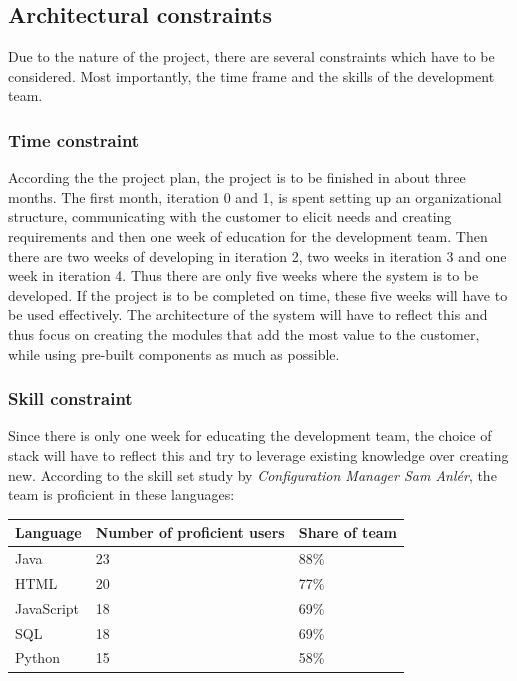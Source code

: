 \documentclass{article}
\begin{document}
\subsection{Architectural constraints}
Due to the nature of the project, there are several constraints which have to be considered. Most importantly, the time frame and the skills of the development team.

\subsubsection{Time constraint}
According the the project plan, the project is to be finished in about three months. The first month, iteration 0 and 1, is spent setting up an organizational structure, communicating with the customer to elicit needs and creating requirements and then one week of education for the development team. Then there are two weeks of developing in iteration 2, two weeks in iteration 3 and one week in iteration 4. 
Thus there are only five weeks where the system is to be developed. If the project is to be completed on time, these five weeks will have to be used effectively. The architecture of the system will have to reflect this and thus focus on creating the modules that add the most value to the customer, while using pre-built components as much as possible.

\subsubsection{Skill constraint}
Since there is only one week for educating the development team, the choice of stack will have to reflect this and try to leverage existing knowledge over creating new. According to the skill set study by \emph{Configuration Manager Sam Anlér}, the team is proficient in these languages:

\begin{table}[h]
\centering
\begin{tabular}{|l|l|l|}
\hline
Language & Number of proficient users & Share of team \\ \hline
Java & 23 & 88\% \\
HTML & 20 & 77\% \\ 
JavaScript & 18 & 69\% \\ 
SQL & 18 & 69\% \\ 
Python & 15 & 58\% \\ 
\hline
\end{tabular}
\end{table}
\end{document}
